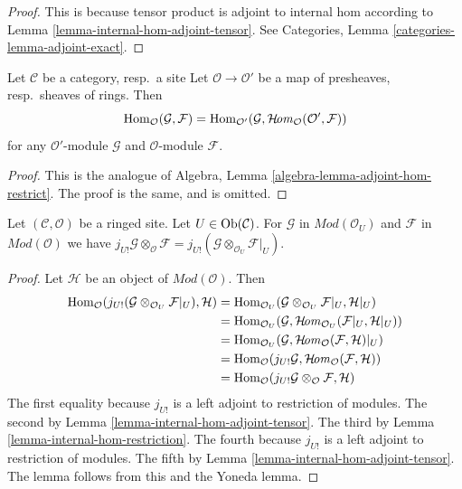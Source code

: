 \begin{proof}
This is because tensor product is adjoint to internal hom according
to Lemma \ref{lemma-internal-hom-adjoint-tensor}.
See Categories, Lemma \ref{categories-lemma-adjoint-exact}.
\end{proof}

\begin{lemma}
\label{lemma-adjoint-hom-restrict}
Let $\mathcal{C}$ be a category, resp.\ a site
Let $\mathcal{O} \to \mathcal{O}'$ be a map of presheaves, resp.\ sheaves
of rings. Then
$$
\mathop{\mathrm{Hom}}\nolimits_\mathcal{O}(\mathcal{G}, \mathcal{F}) =
\mathop{\mathrm{Hom}}\nolimits_{\mathcal{O}'}(\mathcal{G},
\mathop{\mathcal{H}\!\mathit{om}}\nolimits_\mathcal{O}(\mathcal{O}', \mathcal{F}))
$$
for any $\mathcal{O}'$-module $\mathcal{G}$ and $\mathcal{O}$-module
$\mathcal{F}$.
\end{lemma}

\begin{proof}
This is the analogue of
Algebra, Lemma \ref{algebra-lemma-adjoint-hom-restrict}.
The proof is the same, and is omitted.
\end{proof}

\begin{lemma}
\label{lemma-j-shriek-and-tensor}
Let $(\mathcal{C}, \mathcal{O})$ be a ringed site.
Let $U \in \mathop{\mathrm{Ob}}\nolimits(\mathcal{C})$.
For $\mathcal{G}$ in $\textit{Mod}(\mathcal{O}_U)$
and $\mathcal{F}$ in $\textit{Mod}(\mathcal{O})$
we have $j_{U!}\mathcal{G} \otimes_\mathcal{O} \mathcal{F} =
j_{U!}(\mathcal{G} \otimes_{\mathcal{O}_U} \mathcal{F}|_U)$.
\end{lemma}

\begin{proof}
Let $\mathcal{H}$ be an object of $\textit{Mod}(\mathcal{O})$.
Then
\begin{align*}
\mathop{\mathrm{Hom}}\nolimits_\mathcal{O}(j_{U!}(\mathcal{G} \otimes_{\mathcal{O}_U} \mathcal{F}|_U),
\mathcal{H})
& =
\mathop{\mathrm{Hom}}\nolimits_{\mathcal{O}_U}(\mathcal{G} \otimes_{\mathcal{O}_U} \mathcal{F}|_U,
\mathcal{H}|_U) \\
& =
\mathop{\mathrm{Hom}}\nolimits_{\mathcal{O}_U}(\mathcal{G},
\mathop{\mathcal{H}\!\mathit{om}}\nolimits_{\mathcal{O}_U}(\mathcal{F}|_U, \mathcal{H}|_U)) \\
& =
\mathop{\mathrm{Hom}}\nolimits_{\mathcal{O}_U}(\mathcal{G},
\mathop{\mathcal{H}\!\mathit{om}}\nolimits_\mathcal{O}(\mathcal{F}, \mathcal{H})|_U) \\
& =
\mathop{\mathrm{Hom}}\nolimits_\mathcal{O}(j_{U!}\mathcal{G},
\mathop{\mathcal{H}\!\mathit{om}}\nolimits_\mathcal{O}(\mathcal{F}, \mathcal{H})) \\
& =
\mathop{\mathrm{Hom}}\nolimits_\mathcal{O}(j_{U!}\mathcal{G} \otimes_\mathcal{O} \mathcal{F},
\mathcal{H})
\end{align*}
The first equality because $j_{U!}$ is a left adjoint to restriction
of modules.
The second by Lemma \ref{lemma-internal-hom-adjoint-tensor}.
The third by Lemma \ref{lemma-internal-hom-restriction}.
The fourth because $j_{U!}$ is a left adjoint to restriction
of modules.
The fifth by Lemma \ref{lemma-internal-hom-adjoint-tensor}.
The lemma follows from this and the Yoneda lemma.
\end{proof}

